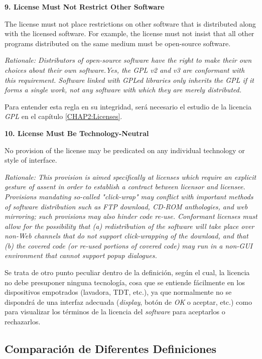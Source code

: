 {\bf 9. License Must Not Restrict Other Software

The license must not place restrictions on other software that is distributed
along with the licensed software. For example, the license must not insist that
all other programs distributed on the same medium must be open-source software.}

\textit{Rationale: Distributors of open-source software have the right to make
their own choices about their own software.\newline Yes, the GPL v2 and v3 are
conformant with this requirement. Software linked with GPLed libraries only
inherits the GPL if it forms a single work, not any software with which they are
merely distributed.}\newline

Para entender esta regla en su integridad, será necesario el estudio de la
licencia \textit{GPL} en el capítulo \ref{CHAP2:Licenses}.\newline

{\bf 10. License Must Be Technology-Neutral

No provision of the license may be predicated on any individual technology or
style of interface.}

\textit{Rationale: This provision is aimed specifically at licenses which
require an explicit gesture of assent in order to establish a contract between
licensor and licensee. Provisions mandating so-called "click-wrap" may conflict
with important methods of software distribution such as FTP download, CD-ROM
anthologies, and web mirroring; such provisions may also hinder code re-use.
Conformant licenses must allow for the possibility that (a) redistribution of
the software will take place over non-Web channels that do not support
click-wrapping of the download, and that (b) the covered code (or re-used
portions of covered code) may run in a non-GUI environment that cannot support
popup dialogues.}\newline

Se trata de otro punto peculiar dentro de la definición, según el cual, la
licencia no debe presuponer ninguna tecnología, cosa que se entiende
fácilmente en los dispositivos empotrados (lavadora, TDT, etc.), ya que
normalmente no se dispondrá de una interfaz adecuada (\textit{display}, botón de
\textit{OK} o aceptar, etc.) como para visualizar los términos de la licencia
del \textit{software} para aceptarlos o rechazarlos.

\subsection{Comparación de Diferentes Definiciones}

